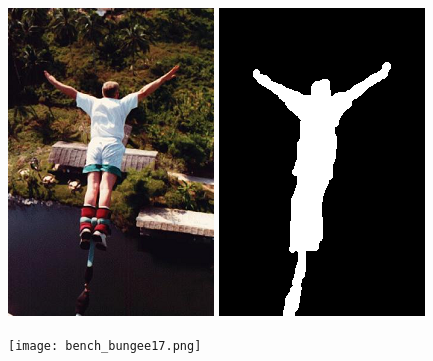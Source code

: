 \documentclass[a4paper, 10pt]{article}
\begin{document}
\begin{figure}[H]
\begin{minipage}{.4\textwidth}
\centering
\includegraphics[scale=0.23]{images/bungee.png}
\end{minipage}%
\begin{minipage}{.4\textwidth}
\centering
\includegraphics[scale=0.23]{images/bungee-mask.png}
\end{minipage}%
\begin{minipage}{.4\textwidth}
\centering
\texttt{[image: bench\_bungee17.png]}
\end{minipage}%
\end{figure}
\end{document}
